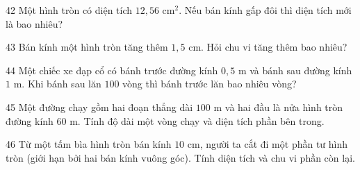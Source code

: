 \gap
\begin{probbox}{42}{}
Một hình tròn có diện tích $12{,}56$ cm$^2$. Nếu bán kính gấp đôi thì diện tích mới là bao nhiêu?
\end{probbox}
\gap
\begin{probbox}{43}{}
Bán kính một hình tròn tăng thêm $1{,}5$ cm. Hỏi chu vi tăng thêm bao nhiêu?
\end{probbox}
\gap
\begin{probbox}{44}{}
Một chiếc xe đạp cổ có bánh trước đường kính $0{,}5$ m và bánh sau đường kính $1$ m. Khi bánh sau lăn $100$ vòng thì bánh trước lăn bao nhiêu vòng?
\end{probbox}
\gap
\begin{probbox}{45}{}
Một đường chạy gồm hai đoạn thẳng dài $100$ m và hai đầu là nửa hình tròn đường kính $60$ m. Tính độ dài một vòng chạy và diện tích phần bên trong.
\end{probbox}
\gap
\begin{probbox}{46}{}
Từ một tấm bìa hình tròn bán kính $10$ cm, người ta cắt đi một phần tư hình tròn (giới hạn bởi hai bán kính vuông góc). Tính diện tích và chu vi phần còn lại.
\end{probbox}
